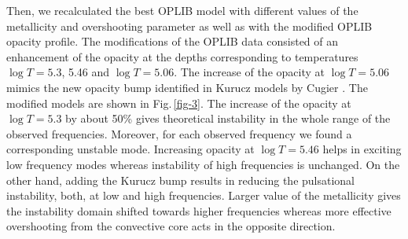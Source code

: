 \documentclass[epj,twocolumn]{webofc}
\begin{document}
Then, we recalculated the best OPLIB model with
different values of the metallicity and overshooting parameter
as well as with the modified OPLIB opacity profile.
The modifications of the OPLIB data consisted of an enhancement of the opacity at the depths corresponding to temperatures $\log T=5.3$, 5.46
and $\log T=5.06$. The increase of the opacity at $\log T=5.06$ mimics the new opacity bump identified in Kurucz models by Cugier \citep{Cugier2014}.
The modified models are shown in Fig.\,\ref{fig-3}.
The increase of the opacity at $\log T=5.3$ by about 50\% gives theoretical instability in the whole range of the observed frequencies.
Moreover, for each observed frequency we found a corresponding unstable mode. Increasing opacity at
$\log T=5.46$ helps in exciting low frequency modes whereas instability of high frequencies is unchanged. On the other
hand, adding the Kurucz bump results in reducing the pulsational instability, both, at low and high frequencies.
Larger value of the metallicity gives the instability domain shifted towards higher frequencies
whereas more effective overshooting
from the convective core acts in the opposite direction.
\end{document}

